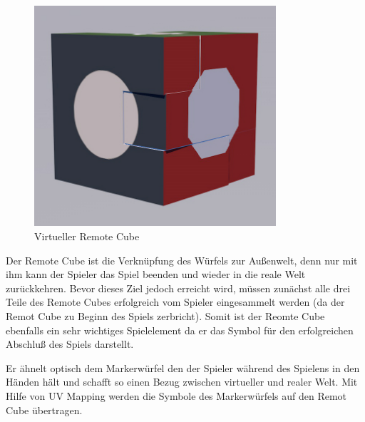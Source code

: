 \begin{figure}[!htbp]%
	\centering
		\includegraphics[width=0.8\textwidth]{images/RemoteCubeC4D}
	\caption{Virtueller Remote Cube}
	\label{fig:RemoteCube}
\end{figure}

Der Remote Cube ist die Verknüpfung des Würfels zur Außenwelt, denn nur mit ihm kann der Spieler das Spiel beenden und wieder in die reale Welt zurückkehren. Bevor dieses Ziel jedoch erreicht wird, müssen zunächst alle drei Teile des Remote Cubes erfolgreich vom Spieler eingesammelt werden (da der Remot Cube zu Beginn des Spiels zerbricht). Somit ist der Reomte Cube ebenfalls ein sehr wichtiges Spielelement da er das Symbol für den erfolgreichen Abschluß des Spiels darstellt.

Er ähnelt optisch dem Markerwürfel den der Spieler während des Spielens in den Händen hält und schafft so einen Bezug zwischen virtueller und realer Welt. Mit Hilfe von UV Mapping werden die Symbole des Markerwürfels auf den Remot Cube übertragen.